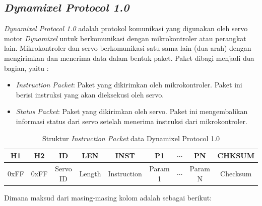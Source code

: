 \subsection{\emph{Dynamixel Protocol 1.0}}
\emph{Dynamixel Protocol 1.0} adalah protokol komunikasi yang digunakan oleh
servo motor \emph{Dynamixel} untuk berkomunikasi dengan mikrokontroler atau
perangkat lain. Mikrokontroler dan servo berkomunikasi satu sama lain (dua arah)
dengan mengirimkan dan menerima data dalam bentuk paket. Paket dibagi menjadi dua
bagian, yaitu : 
\begin{itemize}
  \item \emph{Instruction Packet}: Paket yang dikirimkan oleh mikrokontroler. Paket ini
  berisi instruksi yang akan dieksekusi oleh servo. 
  \item \emph{Status Packet}: Paket yang dikirimkan oleh servo. Paket ini mengembalikan
  informasi status dari servo setelah menerima instruksi dari mikrokontroler. 
\end{itemize}  
\begin{table}[H]
  \centering
  \caption{Struktur \emph{Instruction Packet} data Dynamixel Protocol 1.0}
  \label{tab:DynamixelPacket}
  \renewcommand{\arraystretch}{1.5}
  \begin{tabular}{|c|c|c|c|c|c|c|c|c|}
    \hline
    \textbf{H1} & \textbf{H2} & \textbf{ID} & \textbf{LEN} & \textbf{INST} & \textbf{P1} & \textbf{$\cdots$} & \textbf{PN} & \textbf{CHKSUM} \\
    \hline
    0xFF & 0xFF & Servo ID & Length & Instruction & Param 1 & $\cdots$ & Param N & Checksum \\
    \hline
  \end{tabular}
\end{table}
Dimana maksud dari masing-masing kolom adalah sebagai berikut:
